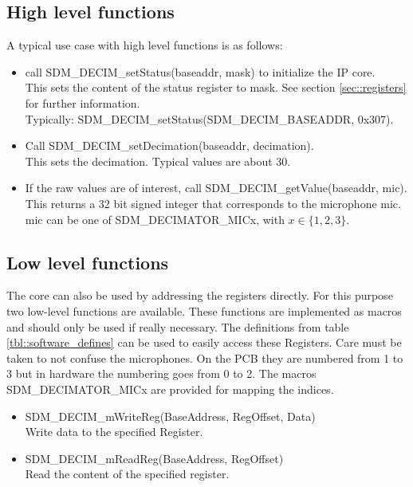\subsection{High level functions}
A typical use case with high level functions is as follows:
\begin{itemize}
	\item call SDM\_DECIM\_setStatus(baseaddr, mask) to initialize the IP core. \\
		This sets the content of the status register to mask. See section \ref{sec::registers} for further information.\\
		Typically: SDM\_DECIM\_setStatus(SDM\_DECIM\_BASEADDR, 0x307).
	\item Call SDM\_DECIM\_setDecimation(baseaddr, decimation). \\
		This sets the decimation. Typical values are about 30.
	\item If the raw values are of interest, call SDM\_DECIM\_getValue(baseaddr, mic).\\
		This returns a 32 bit signed integer that corresponds to the microphone mic. \\
		mic can be one of SDM\_DECIMATOR\_MICx, with $x\in\{1,2,3\}$.
\end{itemize}

\subsection{Low level functions}
The core can also be used by addressing the registers directly.
For this purpose two low-level functions are available.
These functions are implemented as macros and should only be used if really necessary.
The definitions from table \ref{tbl::software_defines} can be used to easily access these Registers.
Care must be taken to not confuse the microphones. 
On the PCB they are numbered from 1 to 3 but in hardware the numbering goes from 0 to 2.
The macros SDM\_DECIMATOR\_MICx are provided for mapping the indices.

\begin{itemize}
	\item SDM\_DECIM\_mWriteReg(BaseAddress, RegOffset, Data) \\
		Write data to the specified Register. 
	\item SDM\_DECIM\_mReadReg(BaseAddress, RegOffset) \\		
		Read the content of the specified register.
\end{itemize}

